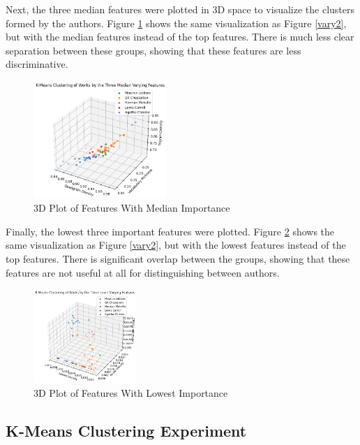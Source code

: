 \documentclass[journal]{IEEEtran} %
\begin{document}
Next, the three median features were plotted in 3D space to visualize the clusters formed by the authors. Figure \ref{vary3} shows the same visualization as Figure \ref{vary2}, but with the median features instead of the top features. There is much less clear separation between these groups, showing that these features are less discriminative.

\begin{figure}
    \caption{3D Plot of Features With Median Importance}
    \begin{center}
    \centerline{\includegraphics[width=0.45\textwidth]{./vary3.png}}
    \end{center}
    \centering
    \label{vary3}
\end{figure}

Finally, the lowest three important features were plotted. Figure \ref{vary4} shows the same visualization as Figure \ref{vary2}, but with the lowest features instead of the top features. There is significant overlap between the groups, showing that these features are not useful at all for distinguishing between authors.

\begin{figure}[h!]
    \caption{3D Plot of Features With Lowest Importance}
    \begin{center}
    \centerline{\includegraphics[width=0.35\textwidth]{./vary4.png}}
    \end{center}
    \centering
    \label{vary4}
\end{figure}

\subsection{K-Means Clustering Experiment}
\end{document}
